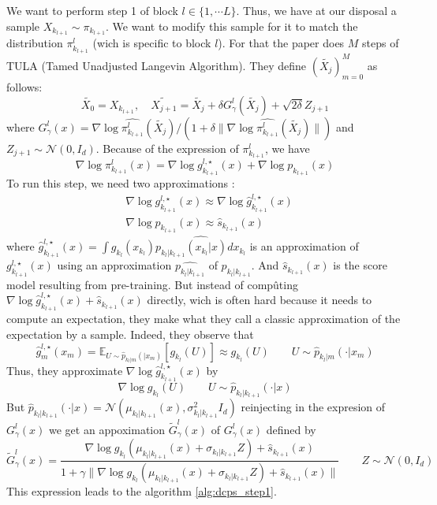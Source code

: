 \documentclass[12pt]{article}
\begin{document}
We want to perform step 1 of block $l \in \{1,\cdots L\}$. 
Thus, we have at our disposal a sample $X_{k_{l+1}} \sim \pi_{k_{l+1}}$. 
We want to modify this sample for it to match the distribution $\pi^l_{k_{l+1}}$ 
(wich is specific to block $l$).
For that the paper does $M$ steps of TULA (Tamed Unadjusted Langevin Algorithm). 
They define $(\tilde{X_j})_{m=0}^M$ as follows:
\begin{equation}
\tilde{X_0} = X_{k_{l+1}}, \quad
\tilde{X_{j+1}} = \tilde{X_j} + \delta G^l_\gamma(\tilde{X_j}) + \sqrt{2 \delta} Z_{j+1}
\end{equation}
where $G^l_\gamma(x) = \nabla \log \hat{\pi^l_{k_{l+1}}}(\tilde{X_j})/(1 + \delta \| \nabla \log \hat{\pi^l_{k_{l+1}}}(\tilde{X_j}) \|)$ 
and $Z_{j+1} \sim \mathcal{N}(0, I_d)$.
Because of the expression of $\pi^l_{k_{l+1}}$, we have
\begin{equation}
\nabla \log \pi^l_{k_{l+1}}(x)
= \nabla \log g_{k_{l+1}}^{l,\star}(x) + \nabla \log p_{k_{l+1}}(x)
\end{equation}
To run this step, we need two approximations :
\begin{align*}
& \nabla \log g_{k_{l+1}}^{l,\star}(x) 
\approx \nabla \log \hat{g}_{k_{l+1}}^{l,\star}(x) \\
& \nabla \log p_{k_{l+1}}(x) 
\approx \hat{s}_{k_{l+1}}(x)
\end{align*}
where $\hat{g}_{k_{l+1}}^{l,\star}(x) = \int g_{k_l}(x_{k_l}) \hat{p_{k_l|k_{l+1}}(x_{k_l} | x) dx_{k_l}}$
is an approximation of $g_{k_{l+1}}^{l,\star}(x)$ using an approximation $\hat{p_{k_l|k_{l+1}}}$ of $p_{k_l|k_{l+1}}$.
And $\hat{s}_{k_{l+1}}(x)$ is the score model resulting from pre-training.
But instead of compûting $\nabla \log \hat{g}_{k_{l+1}}^{l,\star}(x) + \hat{s}_{k_{l+1}}(x)$ directly, 
wich is often hard because it needs to compute an expectation, they make what they call a classic approximation
of the expectation by a sample. Indeed, they observe that
\begin{equation}
    \hat{g}_m^{l, \star}(x_m) 
    = \mathbb{E}_{U \sim \hat{p}_{k_l|m}(|x_m)} \left[ g_{k_l}(U) \right]
    \approx g_{k_l}(U) \quad \quad U \sim \hat{p}_{k_l|m}(\cdot|x_m)
\end{equation}
Thus, they approximate $\nabla \log \hat{g}_{k_{l+1}}^{l,\star}(x)$ by
\begin{equation}
\nabla \log g_{k_l}(U) \quad \quad U \sim \hat{p}_{k_l|k_{l+1}}(\cdot|x)
\end{equation}
But $\hat{p}_{k_l|k_{l+1}}(\cdot|x) = \mathcal{N}(\mu_{k_l|k_{l+1}}(x), \sigma_{k_l|k_{l+1}}^2 I_d)$
reinjecting in the expresion of $G_\gamma^l(x)$ we get an appoximation $\tilde{G}_\gamma^l(x)$ of $G_\gamma^l(x)$ defined by
\begin{equation}
\tilde{G}_\gamma^l(x) = \frac{\nabla \log g_{k_l}(\mu_{k_l|k_{l+1}}(x) + \sigma_{k_l|k_{l+1}} Z) + \hat{s}_{k_{l+1}}(x)}
{1 + \gamma \| \nabla \log g_{k_l}(\mu_{k_l|k_{l+1}}(x) + \sigma_{k_l|k_{l+1}} Z) + \hat{s}_{k_{l+1}}(x) \|} 
\quad \quad Z \sim \mathcal{N}(0, I_d)
\end{equation}
This expression leads to the algorithm \ref{alg:dcps_step1}.
\end{document}

